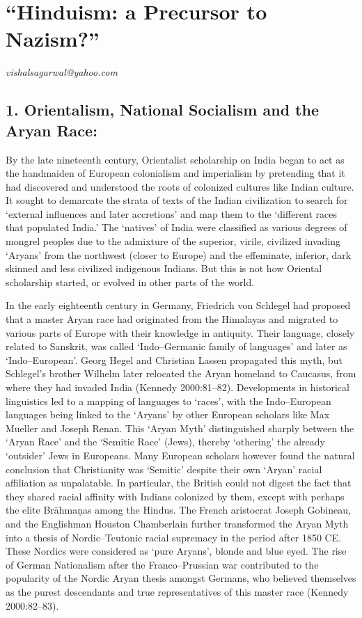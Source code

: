 
\chapter{“Hinduism: a Precursor to Nazism?”}\label{chapter8}


\begin{flushright}
\textit{vishalsagarwal@yahoo.com}
\end{flushright}


\section*{1. Orientalism, National Socialism and the Aryan Race:}

By the late nineteenth century, Orientalist scholarship on India began to act as the handmaiden of European colonialism and imperialism by pretending that it had discovered and understood the roots of colonized cultures like Indian culture. It sought to demarcate the strata of texts of the Indian civilization to search for ‘external influences and later accretions’ and map them to the ‘different races that populated India.’ The ‘natives’ of India were classified as various degrees of mongrel peoples due to the admixture of the superior, virile, civilized invading ‘Aryans’ from the northwest (closer to Europe) and the effeminate, inferior, dark skinned and less civilized indigenous Indians. But this is not how Oriental scholarship started, or evolved in other parts of the world.

In the early eighteenth century in Germany, Friedrich von Schlegel had proposed that a master Aryan race had originated from the Himalayas and migrated to various parts of Europe with their knowledge in antiquity. Their language, closely related to Sanskrit, was called ‘Indo–Germanic family of languages’ and later as ‘Indo–European’. Georg Hegel and Christian Lassen propagated this myth, but Schlegel’s brother Wilhelm later relocated the Aryan homeland to Caucasus, from where they had invaded India (Kennedy 2000:81–82). Developments in historical linguistics led to a mapping of languages to ‘races’, with the Indo–European languages being linked to the ‘Aryans’ by other European scholars like Max Mueller and Joseph Renan. This ‘Aryan Myth’ distinguished sharply between the ‘Aryan Race’ and the ‘Semitic Race’ (Jews), thereby ‘othering’ the already ‘outsider’ Jews in Europeans. Many European scholars however found the natural conclusion that Christianity was ‘Semitic’ despite their own ‘Aryan’ racial affiliation as unpalatable. In particular, the British could not digest the fact that they shared racial affinity with Indians colonized by them, except with perhaps the elite Brāhmaṇas among the Hindus. The French aristocrat Joseph Gobineau, and the Englishman Houston Chamberlain further transformed the Aryan Myth into a thesis of Nordic–Teutonic racial supremacy in the period after 1850 CE. These Nordics were considered as ‘pure Aryans’, blonde and blue eyed. The rise of German Nationalism after the Franco–Prussian war contributed to the popularity of the Nordic Aryan thesis amongst Germans, who believed themselves as the purest descendants and true representatives of this master race (Kennedy 2000:82–83).


